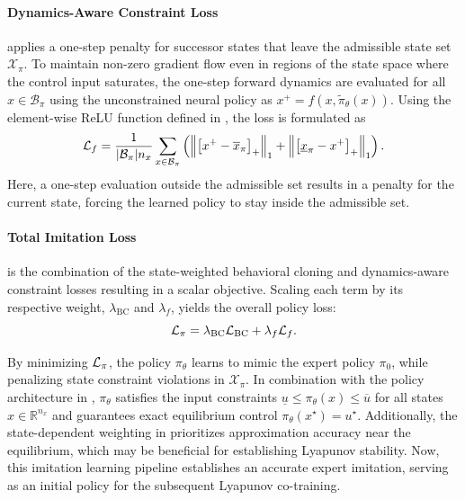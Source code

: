 \paragraph{Dynamics-Aware Constraint Loss} applies a one-step penalty for successor states that leave 
the admissible state set $\mathcal{X}_\pi$. To maintain non-zero gradient flow even in regions of the 
state space where the control input saturates, the one-step forward dynamics are evaluated for all 
$x \in \mathcal{B}_\pi$ using the unconstrained neural policy as $x^+ = f(x,\tilde{\pi}_\theta(x))$. 
Using the element-wise ReLU function defined in , the loss is formulated as
\begin{equation}
    \label{eq:dynamics-aware-loss}
    \mathcal{L}_f = \frac{1}{|\mathcal{B}_\pi| n_x} \sum_{x \in \mathcal{B}_\pi} \left( 
        \left\| 
            \big[ x^+ - \overline{x}_\pi \big]_+ 
        \right\|_1 + \left\| 
            \big[ \underline{x}_\pi - x^+ \big]_+ 
        \right\|_1 
    \right).
\end{equation}
Here, a one-step evaluation outside the admissible set results in a penalty for the current state, 
forcing the learned policy to stay inside the admissible set. 


\paragraph{Total Imitation Loss} is the combination of the state-weighted behavioral cloning 
and dynamics-aware constraint losses resulting in a scalar objective. 
Scaling each term by its respective weight, $\lambda_{\mathrm{BC}}$ and $\lambda_f$, 
yields the overall policy loss:
\begin{equation}
    \label{eq:combined-policy-loss}
    \mathcal{L}_\pi = 
        \lambda_{\mathrm{BC}} \mathcal{L}_{\mathrm{BC}} + 
        \lambda_f \mathcal{L}_f.
\end{equation}

By minimizing $\mathcal{L}_\pi$, the policy $\pi_\theta$ learns to mimic the expert policy $\pi_0$, 
while penalizing state constraint violations in $\mathcal{X}_\pi$. 
In combination with the policy architecture in , $\pi_\theta$ satisfies the input constraints 
$\underline{u} \leq \pi_\theta(x) \leq \overline{u}$ for all states $x \in \mathbb{R}^{n_x}$ and guarantees exact 
equilibrium control $\pi_\theta(x^\star) = u^\star$. 
Additionally, the state-dependent weighting in  prioritizes approximation accuracy 
near the equilibrium, which may be beneficial for establishing Lyapunov stability.
Now, this imitation learning pipeline establishes an accurate expert imitation, 
serving as an initial policy for the subsequent Lyapunov co-training.
